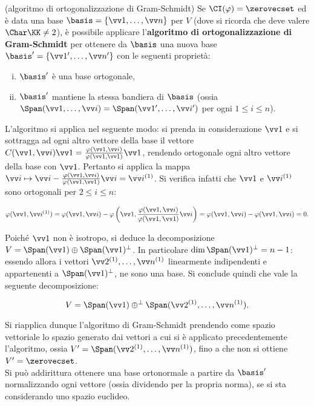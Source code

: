 \documentclass[11pt]{article}
\begin{document}
	\begin{remark} (algoritmo di ortogonalizzazione di Gram-Schmidt)
		Se $\CI(\varphi) = \zerovecset$ ed è
		data una base $\basis = \{ \vv 1, \ldots, \vv n \}$ per $V$ (dove si ricorda che deve valere
		$\Char \KK \neq 2$), è possibile
		applicare l'\textbf{algoritmo di ortogonalizzazione di Gram-Schmidt} per ottenere
		da $\basis$ una nuova base $\basis' = \{ \vv 1', \ldots, \vv n' \}$ con le seguenti proprietà:
		
		\begin{enumerate}[(i)]
			\item $\basis'$ è una base ortogonale,
			\item $\basis'$ mantiene la stessa bandiera di $\basis$ (ossia $\Span(\vv 1, \ldots, \vv i) = \Span(\vv 1', \ldots, \vv i')$ per ogni $1 \leq i \leq n$).
		\end{enumerate}
	
		L'algoritmo si applica nel seguente modo: si prenda in considerazione $\vv 1$ e si sottragga ad ogni altro vettore
		della base il vettore $C(\vv 1, \vv i) \vv 1 = \frac{\varphi(\vv 1, \vv i)}{\varphi(\vv 1, \vv 1)} \vv 1$,
		rendendo ortogonale ogni altro vettore della base con $\vv 1$. Pertanto si applica la mappa
		$\vv i \mapsto \vv i - \frac{\varphi(\vv 1, \vv i)}{\varphi(\vv 1, \vv 1)} \vv i = \vv i ^{(1)}$.
		Si verifica infatti che $\vv 1$ e $\vv i ^{(1)}$ sono ortogonali per $2 \leq i \leq n$:
		
		\[ \varphi(\vv 1, \vv i^{(1)}) = \varphi(\vv 1, \vv i) - \varphi\left(\vv 1, \frac{\varphi(\vv 1, \vv i)}{\varphi(\vv 1, \vv 1)} \vv i\right) = \varphi(\vv 1, \vv i) - \varphi(\vv 1, \vv i) = 0. \]
		
		Poiché $\vv 1$ non è isotropo, si deduce la decomposizione $V = \Span(\vv 1) \oplus \Span(\vv 1)^\perp$.
		In particolare $\dim \Span(\vv 1)^\perp = n-1$: essendo allora i vettori $\vv 2 ^{(1)}, \ldots, \vv n ^{(1)}$
		linearmente indipendenti e appartenenti a $\Span(\vv 1)^\perp$, ne sono una base. Si conclude quindi
		che vale la seguente decomposizione:
		
		\[ V = \Span(\vv 1) \oplus^\perp \Span(\vv 2 ^{(1)}, \ldots, \vv n ^{(1)}). \]
		
		\vskip 0.05in

		Si riapplica dunque l'algoritmo di Gram-Schmidt prendendo come spazio vettoriale lo spazio generato dai
		vettori a cui si è applicato precedentemente l'algoritmo, ossia $V' = \Span(\vv 2 ^{(1)}, \ldots, \vv n ^{(1)})$,
		fino a che non si ottiene $V' = \zerovecset$. \\
		
		Si può addirittura ottenere una base ortonormale a partire da $\basis'$ normalizzando ogni vettore (ossia
		dividendo per la propria norma), se si sta considerando uno spazio euclideo.
	\end{remark}
\end{document}
